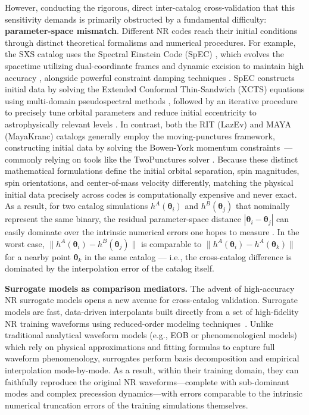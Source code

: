 \documentclass[%
 reprint,
superscriptaddress,
 amsmath,amssymb,
 aps,
]{revtex4-2}
\begin{document}
However, conducting the rigorous, direct inter-catalog cross-validation that this sensitivity demands is primarily obstructed by a fundamental difficulty: \textbf{parameter-space mismatch}. Different NR codes reach their initial conditions through distinct theoretical formalisms and numerical procedures. For example, the SXS catalog uses the Spectral Einstein Code (SpEC) \cite{Kidder:2000yq, Scheel:2006gg}, which evolves the spacetime utilizing dual-coordinate frames and dynamic excision to maintain high accuracy \cite{Scheel:2006gg, Hemberger:2012jz}, alongside powerful constraint damping techniques \cite{Szilagyi:2009qz}. SpEC constructs initial data by solving the Extended Conformal Thin-Sandwich (XCTS) equations using multi-domain pseudospectral methods \cite{Pfeiffer:2002wt}, followed by an iterative procedure to precisely tune orbital parameters and reduce initial eccentricity to astrophysically relevant levels \cite{Pfeiffer:2007yz, Buonanno:2010yk}. In contrast, both the RIT (LazEv) and MAYA (MayaKranc) catalogs generally employ the moving-punctures framework, constructing initial data by solving the Bowen-York momentum constraints~\cite{Bowen:1980yu, Brandt:1997tf}—commonly relying on tools like the TwoPunctures solver \cite{Ansorg:2004ds}. Because these distinct mathematical formulations define the initial orbital separation, spin magnitudes, spin orientations, and center-of-mass velocity differently, matching the physical initial data precisely across codes is computationally expensive and never exact. As a result, for two catalog simulations $h^A(\boldsymbol{\theta}_i)$ and $h^B(\boldsymbol{\theta}_j)$ that nominally represent the same binary, the residual parameter-space distance $|\boldsymbol{\theta}_i - \boldsymbol{\theta}_j|$ can easily dominate over the intrinsic numerical errors one hopes to measure \cite{hannam2009}. In the worst case, $\|h^A(\boldsymbol{\theta}_i) - h^B(\boldsymbol{\theta}_j)\|$ is comparable to $\|h^A(\boldsymbol{\theta}_i) - h^A(\boldsymbol{\theta}_k)\|$ for a nearby point $\boldsymbol{\theta}_k$ in the same catalog — i.e., the cross-catalog difference is dominated by the interpolation error of the catalog itself.

\textbf{Surrogate models as comparison mediators.} The advent of high-accuracy NR surrogate models opens a new avenue for cross-catalog validation. Surrogate models are fast, data-driven interpolants built directly from a set of high-fidelity NR training waveforms using reduced-order modeling techniques~\cite{Blackman:2015pia, Field:2013cfa, Blackman:2017pcm}. Unlike traditional analytical waveform models (e.g., EOB or phenomenological models) which rely on physical approximations and fitting formulas to capture full waveform phenomenology, surrogates perform basis decomposition and empirical interpolation mode-by-mode. As a result, within their training domain, they can faithfully reproduce the original NR waveforms—complete with sub-dominant modes and complex precession dynamics—with errors comparable to the intrinsic numerical truncation errors of the training simulations themselves. 
\end{document}
